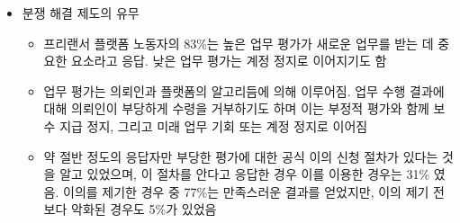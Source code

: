 \begin{itemize}
\begin{itemize}
\begin{itemize}
		\end{itemize}
		\item 분쟁 해결 제도의 유무
		\begin{itemize}
		\item 프리랜서 플랫폼 노동자의 83\%는 높은 업무 평가가 새로운 업무를 받는 데 중요한 요소라고 응답. 낮은 업무 평가는 계정 정지로 이어지기도 함
		\item 업무 평가는 의뢰인과 플랫폼의 알고리듬에 의해 이루어짐. 업무 수행 결과에 대해 의뢰인이 부당하게 수령을 거부하기도 하며 이는 부정적 평가와 함께 보수 지급 정지, 그리고 미래 업무 기회 또는 계정 정지로 이어짐
		\item 약 절반 정도의 응답자만 부당한 평가에 대한 공식 이의 신청 절차가 있다는 것을 알고 있었으며, 이 절차를 안다고 응답한 경우 이를 이용한 경우는 31\% 였음. 이의를 제기한 경우 중 77\%는 만족스러운 결과를 얻었지만, 이의 제기 전보다 악화된 경우도 5\%가 있었음
		

\end{itemize}
\end{itemize}
\end{itemize}
